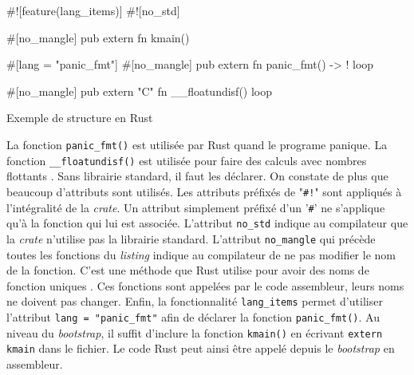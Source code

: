 \begin{code}
\begin{rustcode}
#![feature(lang_items)]
#![no_std]
    
#[no_mangle]
pub extern fn kmain() {}

#[lang = "panic_fmt"]
#[no_mangle]
pub extern fn panic_fmt() -> ! {
    loop {}
}

#[no_mangle]
pub extern "C" fn __floatundisf() {
    loop {}
}
\end{rustcode}
\caption{Exemple de structure en Rust}
\label{lst:exec:kmain}
\end{code} \bigbreak

La fonction \texttt{panic_fmt()} est utilisée par Rust quand le programe
panique. La fonction \texttt{__floatundisf()} est utilisée pour faire
des calculs avec nombres flottants \cite{ref6}. Sans librairie standard, il faut
les déclarer. On constate de plus que beaucoup d'attributs sont utilisés. Les
attributs préfixés de "\texttt{#!}" sont appliqués à l'intégralité de
la \textit{crate}. Un attribut simplement préfixé d'un '\texttt{#}' ne
s'applique qu'à la fonction qui lui est associée. L'attribut \texttt{no_std}
indique au compilateur que la \textit{crate} n'utilise pas la librairie standard.
L'attribut \texttt{no_mangle} qui précède toutes les fonctions du \textit{listing}
indique au compilateur de ne pas modifier le nom de la fonction. C'est une méthode
que Rust utilise pour avoir des noms de fonction uniques \cite{ref8}. Ces fonctions sont
appelées par le code assembleur, leurs noms ne doivent pas changer. Enfin, la fonctionnalité
\texttt{lang_items} permet d'utiliser l'attribut \texttt{lang = "panic_fmt"}
afin de déclarer la fonction \texttt{panic_fmt()}. Au niveau du \textit{bootstrap},
il suffit d'inclure la fonction \texttt{kmain()} en écrivant
\texttt{extern kmain} dans le fichier. Le code Rust peut ainsi être appelé
depuis le \textit{bootstrap} en assembleur.


